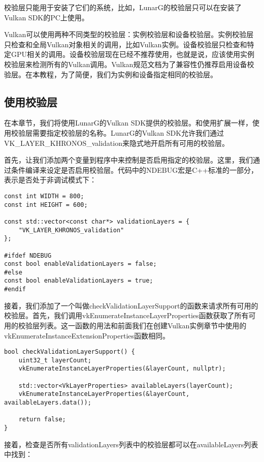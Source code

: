 校验层只能用于安装了它们的系统，比如，LunarG的校验层只可以在安装了Vulkan SDK的PC上使用。

Vulkan可以使用两种不同类型的校验层：实例校验层和设备校验层。实例校验层只检查和全局Vulkan对象相关的调用，比如Vulkan实例。设备校验层只检查和特定GPU相关的调用。设备校验层现在已经不推荐使用，也就是说，应该使用实例校验层来检测所有的Vulkan调用。Vulkan规范文档为了兼容性仍推荐启用设备校验层。在本教程，为了简便，我们为实例和设备指定相同的校验层。

\subsection{使用校验层}

在本章节，我们将使用LunarG的Vulkan SDK提供的校验层。和使用扩展一样，使用校验层需要指定校验层的名称。LunarG的Vulkan SDK允许我们通过VK\_LAYER\_KHRONOS\_validation来隐式地开启所有可用的校验层。

首先，让我们添加两个变量到程序中来控制是否启用指定的校验层。这里，我们通过条件编译来设定是否启用校验层。代码中的NDEBUG宏是C++标准的一部分，表示是否处于非调试模式下：

\begin{lstlisting}[language={[ANSI]C}]
const int WIDTH = 800;
const int HEIGHT = 600;

const std::vector<const char*> validationLayers = {
	"VK_LAYER_KHRONOS_validation"
};

#ifdef NDEBUG
const bool enableValidationLayers = false;
#else
const bool enableValidationLayers = true;
#endif
\end{lstlisting}

接着，我们添加了一个叫做checkValidationLayerSupport的函数来请求所有可用的校验层。首先，我们调用vkEnumerateInstanceLayerProperties函数获取了所有可用的校验层列表。这一函数的用法和前面我们在创建Vulkan实例章节中使用的vkEnumerateInstanceExtensionProperties函数相同。

\begin{lstlisting}[language={[ANSI]C}]
bool checkValidationLayerSupport() {
	uint32_t layerCount;
	vkEnumerateInstanceLayerProperties(&layerCount, nullptr);

	std::vector<VkLayerProperties> availableLayers(layerCount);
	vkEnumerateInstanceLayerProperties(&layerCount, availableLayers.data());

	return false;
}
\end{lstlisting}

接着，检查是否所有validationLayers列表中的校验层都可以在availableLayers列表中找到：

